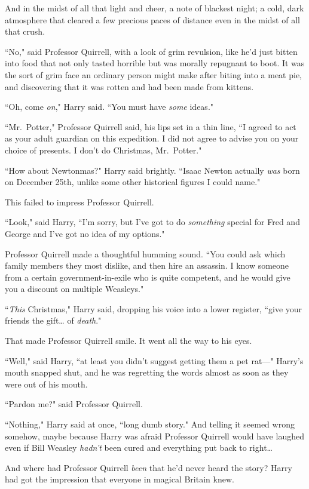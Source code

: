 And in the midst of all that light and cheer, a note of blackest night; a cold, dark atmosphere that cleared a few precious paces of distance even in the midst of all that crush.

``No," said Professor Quirrell, with a look of grim revulsion, like he'd just bitten into food that not only tasted horrible but was morally repugnant to boot. It was the sort of grim face an ordinary person might make after biting into a meat pie, and discovering that it was rotten and had been made from kittens.

``Oh, come \emph{on}," Harry said. ``You must have \emph{some} ideas."

``Mr.~Potter," Professor Quirrell said, his lips set in a thin line, ``I agreed to act as your adult guardian on this expedition. I did not agree to advise you on your choice of presents. I don't do Christmas, Mr.~Potter."

``How about Newtonmas?" Harry said brightly. ``Isaac Newton actually \emph{was} born on December 25th, unlike some other historical figures I could name."

This failed to impress Professor Quirrell.

``Look," said Harry, ``I'm sorry, but I've got to do \emph{something} special for Fred and George and I've got no idea of my options."

Professor Quirrell made a thoughtful humming sound. ``You could ask which family members they most dislike, and then hire an assassin. I know someone from a certain government-in-exile who is quite competent, and he would give you a discount on multiple Weasleys."

``\emph{This} Christmas," Harry said, dropping his voice into a lower register, ``give your friends the gift{\ldots} of \emph{death}."

That made Professor Quirrell smile. It went all the way to his eyes.

``Well," said Harry, ``at least you didn't suggest getting them a pet rat—" Harry's mouth snapped shut, and he was regretting the words almost as soon as they were out of his mouth.

``Pardon me?" said Professor Quirrell.

``Nothing," Harry said at once, ``long dumb story." And telling it seemed wrong somehow, maybe because Harry was afraid Professor Quirrell would have laughed even if Bill Weasley \emph{hadn't} been cured and everything put back to right{\ldots}

And where had Professor Quirrell \emph{been} that he'd never heard the story? Harry had got the impression that everyone in magical Britain knew.

